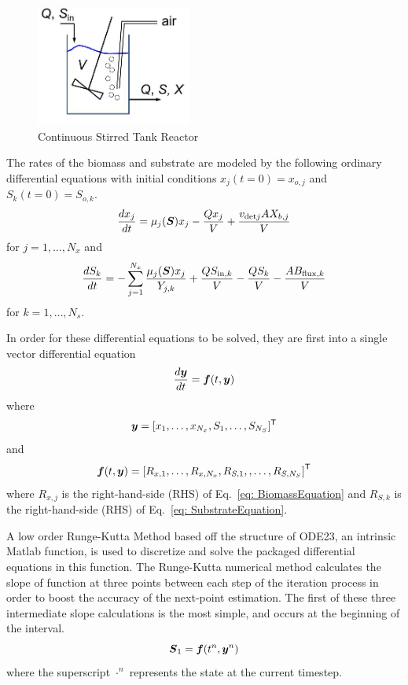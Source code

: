 \documentclass[letterpaper, twoside]{article}
\numberwithin{equation}{section}
\def\bm#1{\mbox{\boldmath{$#1$}}}
\begin{document}
\begin{figure}[H]
\centering
\includegraphics[width=2in]{CSTR_model.jpg}
\caption{Continuous Stirred Tank Reactor}
\end{figure}

The rates of the biomass and substrate are modeled by the following ordinary differential equations with initial conditions $x_j(t=0)=x_{o,j}$ and $S_k(t=0)=S_{o,k}$.
\begin{equation} \label{eq: BiomassEquation}
  \frac{dx_j}{dt} = \mu_j(\bm{S}) x_j - \frac{Q x_j}{V} + \frac{ v_{\mathrm{det}j} A X_{b,j}}{V}
\end{equation}
for $j=1,\dots,N_x$ and 
\begin{equation} \label{eq: SubstrateEquation}
  \frac{dS_k}{dt} = -\sum_{j=1}^{N_x} \frac{\mu_j(\bm{S}) x_j}{Y_{j,k}} + \frac{Q S_{\mathrm{in},k}}{V} - \frac{Q S_k}{V} - \frac{A B_{\mathrm{flux},k}}{V}
\end{equation}
for $k=1,\dots,N_s$.

In order for these differential equations to be solved, they are first into a single vector differential equation
\begin{equation}
  \frac{d \bm{y}}{dt} = \bm{f}(t,\bm{y})
\end{equation}
where 
\begin{equation}
  \bm{y} = [x_1,\dots,x_{N_x}, S_1,\dots,S_{N_S}]^\mathsf{T}
\end{equation}
and 
\begin{equation} \label{eq: ODEpackagef}
  \bm{f}(t,\bm{y}) =\left[ R_{x,1}, \dots, R_{x,N_x},  R_{S,1}, ,\dots, R_{S,N_S}\right]^\mathsf{T}
\end{equation}
where $R_{x,j}$ is the right-hand-side (RHS) of Eq.~\ref{eq: BiomassEquation} and $R_{S,k}$ is the right-hand-side (RHS) of Eq.~\ref{eq: SubstrateEquation}.

A low order Runge-Kutta Method based off the structure of ODE23, an intrinsic Matlab function, is used to discretize and solve the packaged differential equations in this function. The Runge-Kutta numerical method calculates the slope of function at three points between each step of the iteration process in order to boost the accuracy of the next-point estimation. The first of these three intermediate slope calculations is the most simple, and occurs at the beginning of the interval.
\begin{equation} \label{eq: S_1}
  \mathcal{\bm{S}}_1 = \bm{f}(t^n,\bm{y}^n)
\end{equation}
where the superscript $\cdot^n$ represents the state at the current timestep.
\end{document}
